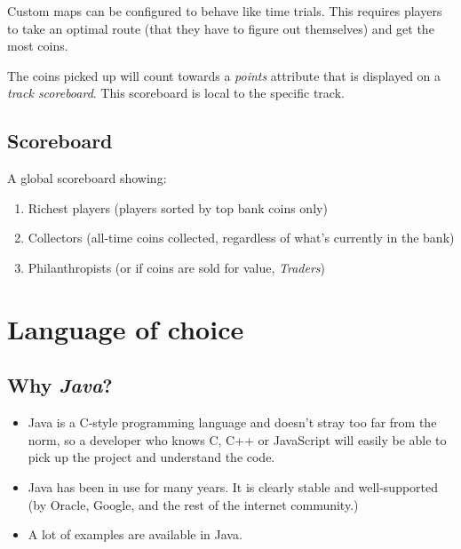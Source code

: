 \documentclass[a4paper]{article}
\begin{document}
Custom maps can be configured to behave like time trials. This requires players to take an optimal route (that they have to figure out themselves) and get the most coins.

The coins picked up will count towards a \emph{points} attribute that is displayed on a \emph{track scoreboard}. This scoreboard is local to the specific track.

\subsection{Scoreboard}
A global scoreboard showing:
\begin{enumerate}
    \item Richest players (players sorted by top bank coins only)
    \item Collectors (all-time coins collected, regardless of what's currently in the bank)
    \item Philanthropists (or if coins are sold for value, \emph{Traders})
\end{enumerate}

\pagebreak

\section{Language of choice}
\label{sec:language}


\subsection{Why \emph{Java}?}
\begin{itemize}
    \item Java is a C-style programming language and doesn't stray too far from the norm, so a developer who knows C, C++ or JavaScript will easily be able to pick up the project and understand the code.
    \item Java has been in use for many years. It is clearly stable and well-supported (by Oracle, Google, and the rest of the internet community.)
    \item A lot of examples are available in Java.
\end{itemize}
\end{document}
